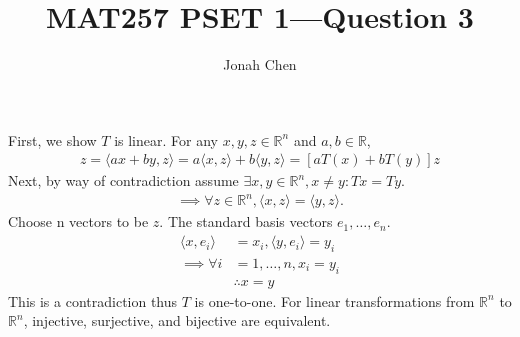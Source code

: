 \documentclass[a4paper]{article}
\title{MAT257 PSET 1---Question 3}
\author{Jonah Chen}
\numberwithin{equation}{section}
\newcommand{\R}{\mathbb{R}}
\begin{document}
\sffamily
\noindent First, we show $T$ is linear. For any $x,y,z\in\R^n$ and $a,b\in\R$,
\begin{align*}
    [T(ax+by)]z=\langle ax+by,z\rangle=a\langle x,z\rangle+b\langle y,z\rangle=[aT(x)+bT(y)]z
\end{align*}
Next, by way of contradiction assume $\exists x,y\in\R^n, x\neq y:Tx=Ty$.
\begin{align*}
    \implies\forall z\in\R^n, \langle x,z\rangle=\langle y,z\rangle.
\end{align*}
Choose n vectors to be $z$. The standard basis vectors $e_1,\dots,e_n$.
\begin{align*}
    \langle x,e_i\rangle&=x_i, \langle y,e_i\rangle=y_i\\
    \implies \forall i&=1,\dots,n, x_i=y_i\\
    &\therefore x=y
\end{align*}
This is a contradiction thus $T$ is one-to-one. For linear transformations from $\R^n$ to $\R^n$, injective, surjective, and bijective are equivalent.
\end{document}
